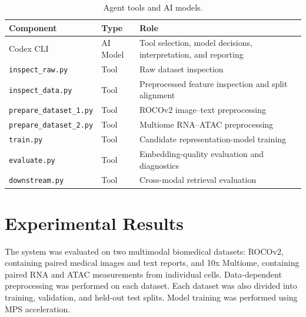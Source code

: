 \documentclass[10pt]{article}
\begin{document}
\begin{table}[H]
    \centering
    \small
    \begin{tabular}{@{}p{3.5cm}p{1.8cm}p{10.0cm}@{}}
        \toprule
        \textbf{Component} & \textbf{Type} & \textbf{Role} \\
        \midrule
        Codex CLI & AI Model &
        Tool selection, model decisions, interpretation, and reporting \\

        \texttt{inspect\_raw.py} & Tool &
        Raw dataset inspection \\

        \texttt{inspect\_data.py} & Tool &
        Preprocessed feature inspection and split alignment \\

        \texttt{prepare\_dataset\_1.py} & Tool &
        ROCOv2 image--text preprocessing \\

        \texttt{prepare\_dataset\_2.py} & Tool &
        Multiome RNA--ATAC preprocessing \\

        \texttt{train.py} & Tool &
        Candidate representation-model training \\

        \texttt{evaluate.py} & Tool &
        Embedding-quality evaluation and diagnostics \\

        \texttt{downstream.py} & Tool &
        Cross-modal retrieval evaluation \\

        \bottomrule
    \end{tabular}
    \caption{Agent tools and AI models.}
    \label{tab:tools}
\end{table}

\section{Experimental Results}

The system was evaluated on two multimodal biomedical datasets: ROCOv2, 
containing paired medical images and text reports, and 10x Multiome, 
containing paired RNA and ATAC measurements from individual cells. 
Data-dependent preprocessing was performed on each dataset. Each dataset was also divided 
into training, validation, and held-out test splits. Model training was performed using MPS acceleration.
\end{document}

